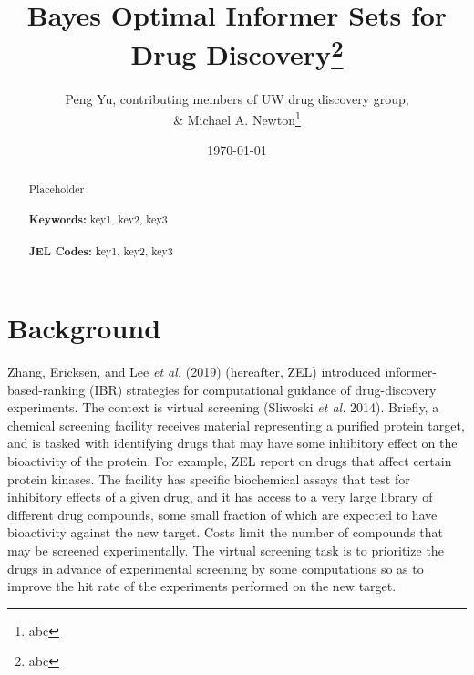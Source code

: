 \documentclass[12pt]{article}
\begin{document}
\begin{titlepage}
\title{Bayes Optimal Informer Sets for Drug Discovery\thanks{abc}}
\author{Peng Yu, {\sc contributing members of UW drug discovery group}, \\  \& Michael A. Newton\thanks{abc}}
\date{\today}
\maketitle
\begin{abstract}
\noindent Placeholder\\
\vspace{0in}\\
\noindent\textbf{Keywords:} key1, key2, key3\\
\vspace{0in}\\
\noindent\textbf{JEL Codes:} key1, key2, key3\\

\bigskip
\end{abstract}
\setcounter{page}{0}
\thispagestyle{empty}
\end{titlepage}
\pagebreak \newpage




\doublespacing


\section{Background} \label{sec:background}

Zhang, Ericksen, and Lee {\em et al.} (2019) (hereafter, ZEL) introduced
informer-based-ranking (IBR) strategies for computational
guidance of drug-discovery experiments.  The context is 
virtual screening (Sliwoski {\em et al.} 2014).   Briefly, a chemical screening facility receives 
material representing a purified protein target, and is tasked with identifying drugs
that may have some inhibitory effect on the bioactivity of the protein.  For example, ZEL report
on drugs that affect certain protein kinases.
The facility has specific biochemical assays that test for
inhibitory effects of a given drug, and it has access to a very large library of different drug compounds, some small fraction of which are expected to have bioactivity
against the new target.   
Costs limit the number of compounds that may be screened experimentally.   The virtual screening task is to prioritize the drugs 
in advance of experimental screening by some computations so as to
improve the hit rate of the experiments performed on the new target.
\end{document}
